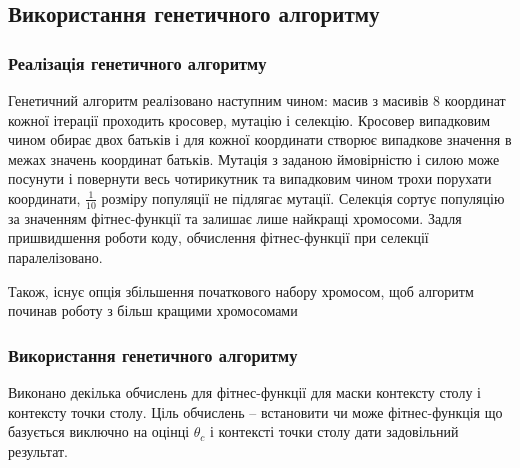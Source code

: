 \documentclass[a4paper,14pt]{report}
\begin{document}
\subsection{Використання генетичного алгоритму}
\subsubsection{Реалізація генетичного алгоритму}
Генетичний алгоритм реалізовано наступним чином: масив з масивів 8 координат кожної ітерації проходить кросовер, мутацію і селекцію. Кросовер випадковим чином обирає двох батьків і для кожної координати створює випадкове значення в межах значень координат батьків. 
Мутація з заданою ймовірністю і силою може посунути і повернути весь чотирикутник та випадковим чином трохи порухати координати, $\frac{1}{10}$ розміру популяції не підлягає мутації. Селекція сортує популяцію за значенням фітнес-функції та залишає лише найкращі хромосоми. 
Задля пришвидшення роботи коду, обчислення фітнес-функції при селекції паралелізовано.

Також, існує опція збільшення початкового набору хромосом, щоб алгоритм починав роботу з більш кращими хромосомами

\subsubsection{Використання генетичного алгоритму}
Виконано декілька обчислень для фітнес-функції для маски контексту столу і контексту точки столу. Ціль обчислень -- встановити чи може фітнес-функція що базується виключно на оцінці $\theta_c$ і контексті точки столу дати задовільний результат.
\end{document}
